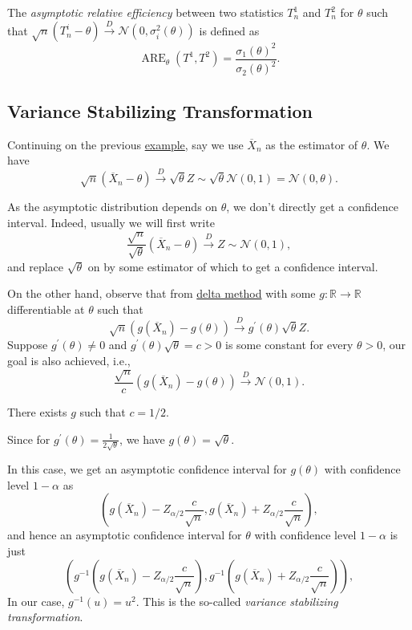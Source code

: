 \begin{definition}\label{def:asymptotic-relative-efficiency}
	The \emph{asymptotic relative efficiency} between two statistics \(T^1_n\) and \(T^2_n\) for \(\theta \) such that \(\sqrt{n} (T_n^i - \theta ) \overset{D}{\to} \mathcal{N} (0, \sigma _i^2(\theta ))\) is defined as
	\[
		\operatorname{ARE}_\theta (T^1, T^2) = \frac{\sigma _1(\theta )^2}{\sigma _2(\theta )^2}.
	\]
\end{definition}

\subsection{Variance Stabilizing Transformation}
Continuing on the previous \hyperref[eg:ARE]{example}, say we use \(\overline{X} _n\) as the estimator of \(\theta \). We have
\[
	\sqrt{n} (\overline{X} _n - \theta ) \overset{D}{\to} \sqrt{\theta } Z \sim \sqrt{\theta } \mathcal{N} (0, 1) = \mathcal{N} (0, \theta ) .
\]

\begin{note}
	As the asymptotic distribution depends on \(\theta \), we don't directly get a confidence interval. Indeed, usually we will first write
	\[
		\frac{\sqrt{n} }{\sqrt{\theta } } (\overline{X} _n - \theta ) \overset{D}{\to} Z \sim \mathcal{N} (0, 1),
	\]
	and replace \(\sqrt{\theta } \) on by some estimator of which to get a confidence interval.
\end{note}

On the other hand, observe that from \hyperref[thm:delta-method]{delta method} with some \(g \colon \mathbb{R} \to \mathbb{R} \) differentiable at \(\theta \) such that
\[
	\sqrt{n} (g(\overline{X} _n) - g(\theta )) \overset{D}{\to} g^{\prime} (\theta ) \sqrt{\theta } Z.
\]
Suppose \(g^{\prime} (\theta ) \neq 0\) and \(g^{\prime} (\theta ) \sqrt{\theta } = c > 0\) is some constant for every \(\theta > 0\), our goal is also achieved, i.e.,
\[
	\frac{\sqrt{n}}{c} (g(\overline{X} _n) - g(\theta )) \overset{D}{\to} \mathcal{N} (0, 1).
\]

\begin{claim}
	There exists \(g\) such that \(c = 1 / 2\).
\end{claim}
\begin{explanation}
	Since for \(g^{\prime} (\theta ) = \frac{1}{2 \sqrt{\theta } }\), we have \(g(\theta ) = \sqrt{\theta } \).
\end{explanation}

In this case, we get an asymptotic confidence interval for \(g(\theta )\) with confidence level \(1 - \alpha \) as
\[
	\left( g(\overline{X} _n) - Z_{\alpha / 2} \frac{c}{\sqrt{n} } , g(\overline{X} _n) + Z_{\alpha / 2} \frac{c}{\sqrt{n} } \right),
\]
and hence an asymptotic confidence interval for \(\theta \) with confidence level \(1 - \alpha \) is just
\[
	\left( g^{-1} \left( g(\overline{X} _n) - Z_{\alpha / 2} \frac{c}{\sqrt{n} } \right) , g^{-1} \left( g(\overline{X} _n) + Z_{\alpha / 2} \frac{c}{\sqrt{n} } \right) \right),
\]
In our case, \(g^{-1} (u) = u^2\). This is the so-called \emph{variance stabilizing transformation}.

